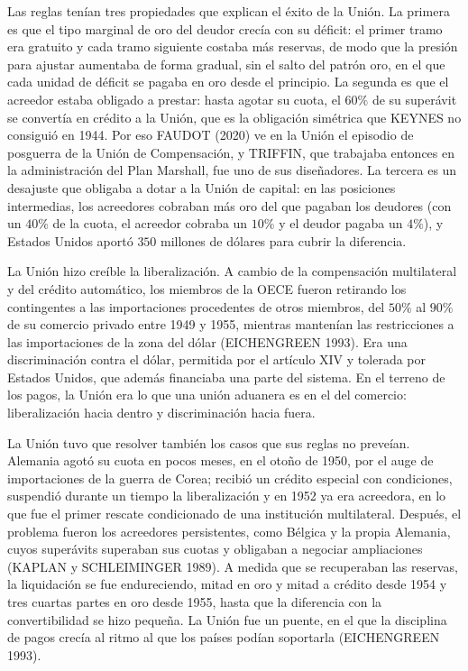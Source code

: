 \documentclass[10pt,a4paper]{article}
\begin{document}
Las reglas tenían tres propiedades que explican el éxito de la Unión. La primera es que el tipo marginal de oro del deudor crecía con su déficit: el primer tramo era gratuito y cada tramo siguiente costaba más reservas, de modo que la presión para ajustar aumentaba de forma gradual, sin el salto del patrón oro, en el que cada unidad de déficit se pagaba en oro desde el principio. La segunda es que el acreedor estaba obligado a prestar: hasta agotar su cuota, el $60\%$ de su superávit se convertía en crédito a la Unión, que es la obligación simétrica que KEYNES no consiguió en 1944. Por eso FAUDOT (2020) ve en la Unión el episodio de posguerra de la Unión de Compensación, y TRIFFIN, que trabajaba entonces en la administración del Plan Marshall, fue uno de sus diseñadores. La tercera es un desajuste que obligaba a dotar a la Unión de capital: en las posiciones intermedias, los acreedores cobraban más oro del que pagaban los deudores (con un $40\%$ de la cuota, el acreedor cobraba un $10\%$ y el deudor pagaba un $4\%$), y Estados Unidos aportó $350$ millones de dólares para cubrir la diferencia.

La Unión hizo creíble la liberalización. A cambio de la compensación multilateral y del crédito automático, los miembros de la OECE fueron retirando los contingentes a las importaciones procedentes de otros miembros, del $50\%$ al $90\%$ de su comercio privado entre 1949 y 1955, mientras mantenían las restricciones a las importaciones de la zona del dólar (EICHENGREEN 1993). Era una discriminación contra el dólar, permitida por el artículo XIV y tolerada por Estados Unidos, que además financiaba una parte del sistema. En el terreno de los pagos, la Unión era lo que una unión aduanera es en el del comercio: liberalización hacia dentro y discriminación hacia fuera.

La Unión tuvo que resolver también los casos que sus reglas no preveían. Alemania agotó su cuota en pocos meses, en el otoño de 1950, por el auge de importaciones de la guerra de Corea; recibió un crédito especial con condiciones, suspendió durante un tiempo la liberalización y en 1952 ya era acreedora, en lo que fue el primer rescate condicionado de una institución multilateral. Después, el problema fueron los acreedores persistentes, como Bélgica y la propia Alemania, cuyos superávits superaban sus cuotas y obligaban a negociar ampliaciones (KAPLAN y SCHLEIMINGER 1989). A medida que se recuperaban las reservas, la liquidación se fue endureciendo, mitad en oro y mitad a crédito desde 1954 y tres cuartas partes en oro desde 1955, hasta que la diferencia con la convertibilidad se hizo pequeña. La Unión fue un puente, en el que la disciplina de pagos crecía al ritmo al que los países podían soportarla (EICHENGREEN 1993).
\end{document}
